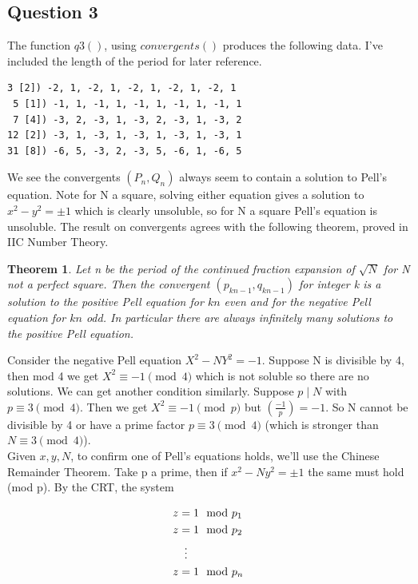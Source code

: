 \documentclass[10pt,a4paper]{report}
\newcommand{\legendre}[2]{(\frac{#1}{#2})}
\newtheorem*{theorem}{Theorem}
\begin{document}
\subsection*{Question 3}

The function $q3()$, using $convergents()$ produces the following data. I've included the length of the period for later reference.

\begin{lstlisting}[breaklines]
 3 [2]) -2, 1, -2, 1, -2, 1, -2, 1, -2, 1
 5 [1]) -1, 1, -1, 1, -1, 1, -1, 1, -1, 1
 7 [4]) -3, 2, -3, 1, -3, 2, -3, 1, -3, 2
12 [2]) -3, 1, -3, 1, -3, 1, -3, 1, -3, 1
31 [8]) -6, 5, -3, 2, -3, 5, -6, 1, -6, 5
\end{lstlisting}

We see the convergents $(P_n, Q_n)$ always seem to contain a solution to Pell's equation. Note for N a square, solving either equation gives a solution to $x^2-y^2=\pm 1$ which is clearly unsoluble, so for N a square Pell's equation is unsoluble. The result on convergents agrees with the following theorem, proved in IIC Number Theory.

\begin{theorem}
Let n be the period of the continued fraction expansion of $\sqrt{N}$ for N not a perfect square. Then the convergent $(p_{kn-1},q_{kn-1})$ for integer k is a solution to the positive Pell equation for $kn$ even and for the negative Pell equation for $kn$ odd. In particular there are always infinitely many solutions to the positive Pell equation.
\end{theorem}



Consider the negative Pell equation $X^2-NY^2=-1$. Suppose N is divisible by 4, then mod 4 we get $X^2\equiv-1\pmod 4$ which is not soluble so there are no solutions. We can get another condition similarly. Suppose $p\mid N$ with $p\equiv 3 \pmod 4$. Then we get $X^2\equiv-1\pmod p$ but $\legendre{-1}{p}=-1$. So N cannot be divisible by 4 or have a prime factor $p\equiv 3\pmod 4$ (which is stronger than $N\equiv 3\pmod 4$).\\

Given $x,y,N$, to confirm one of Pell's equations holds, we'll use the Chinese Remainder Theorem. Take p a prime, then if $x^2-Ny^2=\pm 1$ the same must hold (mod p). By the CRT, the system

\begin{align*}
   z &= 1 \mod p_1\\
   z &= 1 \mod p_2\\
   &\vdotswithin{=} \notag \\
   z &= 1 \mod p_n\\
\end{align*}
\end{document}
